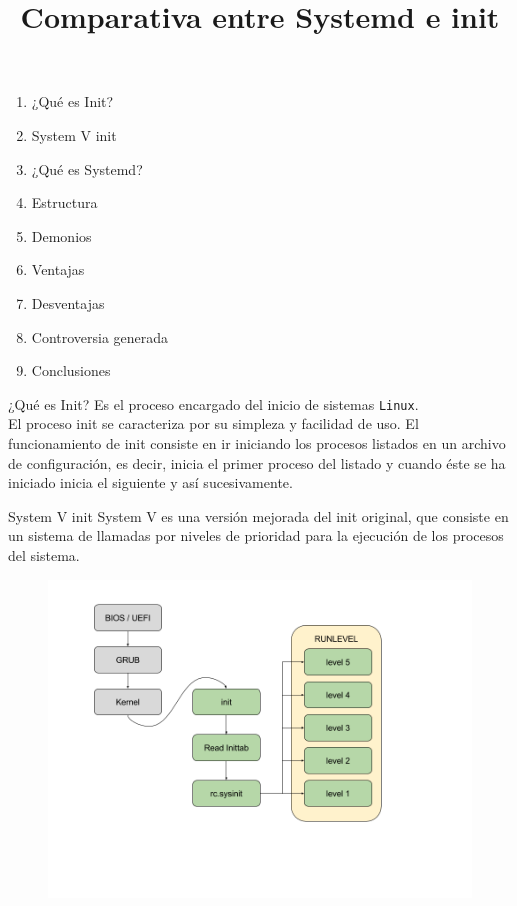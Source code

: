 \documentclass[11pt]{beamer}
\title{Comparativa entre Systemd e init}
\begin{document}
\begin{frame}
\titlepage
\end{frame}

\begin{frame}
\begin{enumerate}
\item ¿Qué es Init?
\item System V init
\item ¿Qué es Systemd?
\item Estructura
\item Demonios
\item Ventajas
\item Desventajas
\item Controversia generada
\item Conclusiones
\end{enumerate}
\end{frame}


\begin{frame}{¿Qué es Init?} %
Es el proceso encargado del inicio de sistemas \texttt{Linux}.\\
\vspace{1cm}
El proceso init se caracteriza por su simpleza y facilidad de uso. El funcionamiento de init consiste en ir iniciando los procesos listados en un archivo de configuración, es decir, inicia el primer proceso del listado y cuando éste se ha iniciado inicia el siguiente y así sucesivamente.
\end{frame}
\begin{frame}{System V init} %
System V es una versión mejorada del init original, que consiste en un sistema de llamadas por niveles de prioridad para la ejecución de los procesos del sistema.


\begin{figure}[H] %
\centering
\includegraphics[scale=0.3]{../imagenes/System_V.png} 
\label{fig:System_V}
\end{figure}


\end{frame}
\end{document}
